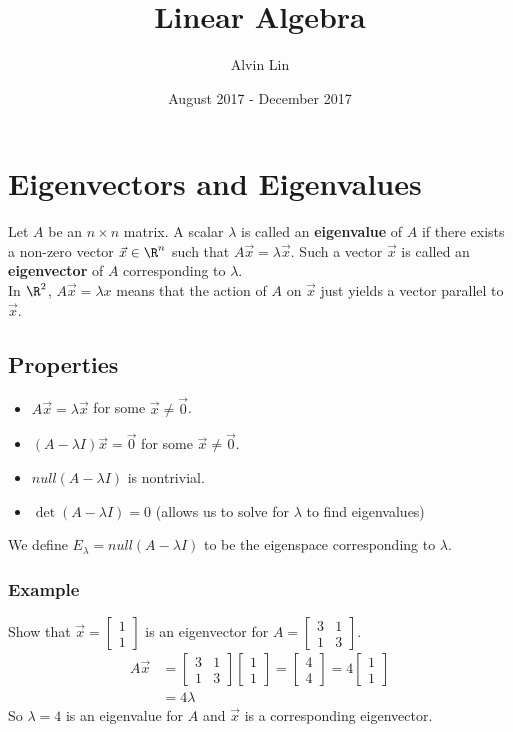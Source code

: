 \documentclass[letterpaper, 12pt]{math}
\title{Linear Algebra}
\author{Alvin Lin}
\date{August 2017 - December 2017}
\begin{document}
\maketitle

\section*{Eigenvectors and Eigenvalues}
Let \( A \) be an \( n\times n \) matrix. A scalar \( \lambda \) is called an
\textbf{eigenvalue} of \( A \) if there exists a non-zero vector \( \vec{x}\in
\R^n \) such that \( A\vec{x} = \lambda\vec{x} \). Such a vector \( \vec{x} \)
is called an \textbf{eigenvector} of \( A \) corresponding to \( \lambda \). \\
In \( \R^2 \), \( A\vec{x} = \lambda x \) means that the action of \( A \) on
\( \vec{x} \) just yields a vector parallel to \( \vec{x} \).

\subsection*{Properties}
\begin{itemize}
  \item \( A\vec{x} = \lambda\vec{x} \) for some \( \vec{x}\ne\vec{0} \).
  \item \( (A-\lambda I)\vec{x} = \vec{0} \) for some \( \vec{x}\ne\vec{0} \).
  \item \( null(A-\lambda I) \) is nontrivial.
  \item \( \det(A-\lambda I) = 0 \) (allows us to solve for \( \lambda \) to
  find eigenvalues)
\end{itemize}
We define \( E_{\lambda} = null(A-\lambda I) \) to be the eigenspace
corresponding to \( \lambda \).

\subsubsection*{Example}
Show that \( \vec{x} = \begin{bmatrix}1 \\ 1\end{bmatrix} \) is an
eigenvector for \( A = \begin{bmatrix}3 & 1 \\ 1 & 3\end{bmatrix} \).
\begin{align*}
  A\vec{x} &= \begin{bmatrix}
    3 & 1 \\
    1 & 3
  \end{bmatrix}\begin{bmatrix}1 \\ 1\end{bmatrix}
    = \begin{bmatrix}4 \\ 4\end{bmatrix}
    = 4\begin{bmatrix}1 \\ 1\end{bmatrix} \\
  &= 4\lambda
\end{align*}
So \( \lambda = 4 \) is an eigenvalue for \( A \) and \( \vec{x} \) is a
corresponding eigenvector.
\end{document}
